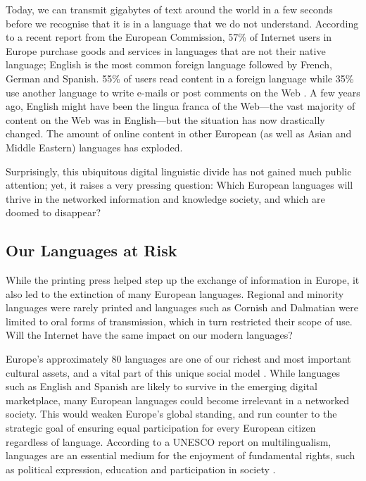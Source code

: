 \documentclass[]{../../metanetpaper}
\begin{document}
\begin{multicols}{2}
Today, we can transmit gigabytes of text around the world in a few seconds before we recognise that it is in a language that we do not understand. According to a recent report from the European Commission, 57\% of Internet users in Europe purchase goods and services in languages that are not their native language; English is the most common foreign language followed by French, German and Spanish. 55\% of users read content in a foreign language while 35\% use another language to write e-mails or post comments on the Web \cite{EC1}. A few years ago, English might have been the lingua franca of the Web—the vast majority of content on the Web was in English—but the situation has now drastically changed. The amount of online content in other European (as well as Asian and Middle Eastern) languages has exploded.

Surprisingly, this ubiquitous digital linguistic divide has not gained much public attention; yet, it raises a very pressing question: Which European languages will thrive in the networked information and knowledge society, and which are doomed to disappear?

\subsection{Our Languages at Risk}

While the printing press helped step up the exchange of information in Europe, it also led to the extinction of many European languages. Regional and minority languages were rarely printed and languages such as Cornish and Dalmatian were limited to oral forms of transmission, which in turn restricted their scope of use. Will the Internet have the same impact on our modern languages?


Europe’s approximately 80 languages are one of our richest and most important cultural assets, and a vital part of this unique social model \cite{EC2}. While languages such as English and Spanish are likely to survive in the emerging digital marketplace, many European languages could become irrelevant in a networked society. This would weaken Europe’s global standing, and run counter to the strategic goal of ensuring equal participation for every European citizen regardless of language. According to a UNESCO report on multilingualism, languages are an essential medium for the enjoyment of fundamental rights, such as political expression, education and participation in society \cite{Unesco1}.


\end{multicols}
\end{document}
